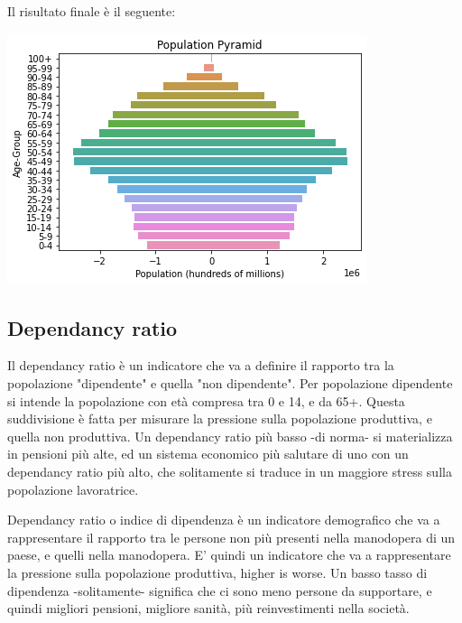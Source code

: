 \documentclass[11pt, oneside]{article}   	%
\begin{document}
Il risultato finale è il seguente:
\begin{center}
\includegraphics[scale=1]{popitaly5}
\end{center}
\subsection{Dependancy ratio}
Il dependancy ratio è un indicatore che va a definire il rapporto tra la popolazione "dipendente" e quella "non dipendente". Per popolazione dipendente si intende la popolazione con età compresa tra 0 e 14, e da 65+.
Questa suddivisione è fatta per misurare la pressione sulla popolazione produttiva, e quella non produttiva. Un dependancy ratio più basso -di norma- si materializza in pensioni più alte, ed un sistema economico più salutare di uno con un dependancy ratio più alto, che solitamente si traduce in un maggiore stress sulla popolazione lavoratrice.

Dependancy ratio o indice di dipendenza è un indicatore demografico che va a rappresentare il rapporto tra le persone non più presenti nella manodopera di un paese, e quelli nella manodopera. E' quindi un indicatore che va a rappresentare la pressione sulla popolazione produttiva, higher is worse. Un basso tasso di dipendenza -solitamente- significa che ci sono meno persone da supportare, e quindi migliori pensioni, migliore sanità, più reinvestimenti nella società.
\end{document}

